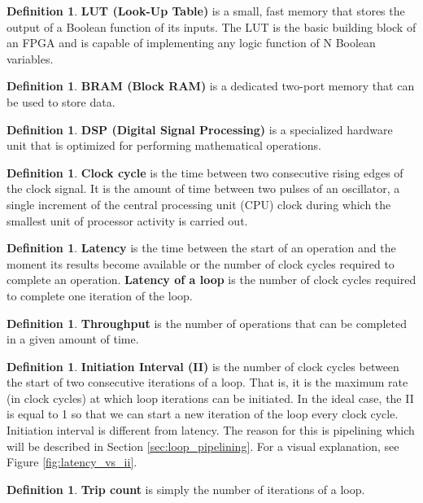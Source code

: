 \documentclass[a4paper, twoside]{report}
\theoremstyle{definition}
\newtheorem{definition}[theorem]{Definition}
\numberwithin{equation}{section}
\begin{document}
\begin{definition}
    \textbf{LUT (Look-Up Table)} is a small, fast memory that stores the output of a Boolean function of its inputs.
    The LUT is the basic building block of an FPGA and is capable of implementing any logic function of N Boolean variables.
\end{definition}
\begin{definition}
    \textbf{BRAM (Block RAM)} is a dedicated two-port memory that can be used to store data.
\end{definition}
\begin{definition}
    \textbf{DSP (Digital Signal Processing)} is a specialized hardware unit that is optimized for performing mathematical operations.
\end{definition}
\begin{definition}
    \textbf{Clock cycle} is the time between two consecutive rising edges of the clock signal.
    It is the amount of time between two pulses of an oscillator, a single increment of the
    central processing unit (CPU) clock during which the smallest unit of processor activity
    is carried out.
\end{definition}
\begin{definition}
    \textbf{Latency} is the time between the start of an operation and the moment its results become available
    or the number of clock cycles required to complete an operation.
    \textbf{Latency of a loop} is the number of clock cycles required to complete one iteration of the loop.
\end{definition}
\begin{definition}
    \textbf{Throughput} is the number of operations that can be completed in a given amount of time.
\end{definition}
\begin{definition}
    \textbf{Initiation Interval (II)} is the number of clock cycles between the start of two consecutive iterations of a loop.
    That is, it is the maximum rate (in clock cycles) at which loop iterations can be initiated.
    In the ideal case, the II is equal to 1 so that we can start a new iteration of the loop every clock cycle.
    Initiation interval is different from latency.
    The reason for this is pipelining which will be described in Section \ref{sec:loop_pipelining}.
    For a visual explanation, see Figure \ref{fig:latency_vs_ii}.
\end{definition}
\begin{definition}
    \textbf{Trip count} is simply the number of iterations of a loop.
\end{definition}
\end{document}
